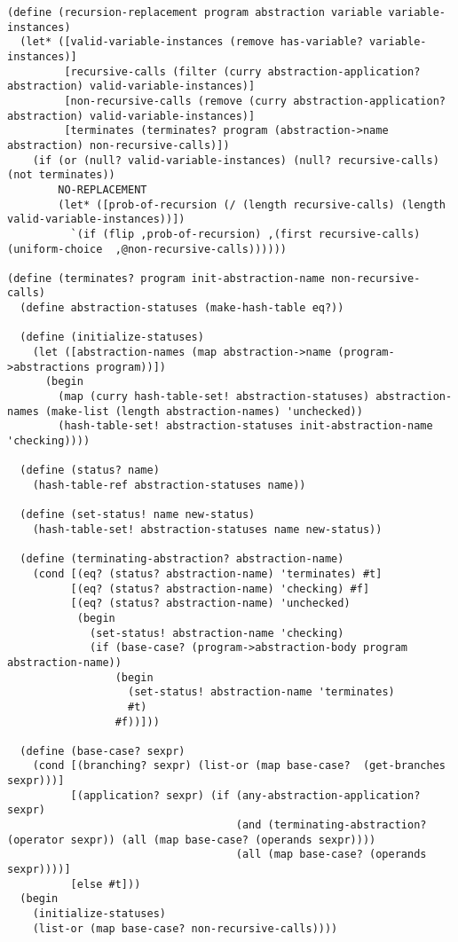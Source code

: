 \documentclass[a4paper,10pt]{article}
\begin{document}
\begin{lstlisting}[frame=trbl]
(define (recursion-replacement program abstraction variable variable-instances)
  (let* ([valid-variable-instances (remove has-variable? variable-instances)]
         [recursive-calls (filter (curry abstraction-application? abstraction) valid-variable-instances)]
         [non-recursive-calls (remove (curry abstraction-application? abstraction) valid-variable-instances)]
         [terminates (terminates? program (abstraction->name abstraction) non-recursive-calls)]) 
    (if (or (null? valid-variable-instances) (null? recursive-calls) (not terminates))
        NO-REPLACEMENT
        (let* ([prob-of-recursion (/ (length recursive-calls) (length valid-variable-instances))])
          `(if (flip ,prob-of-recursion) ,(first recursive-calls) (uniform-choice  ,@non-recursive-calls))))))

(define (terminates? program init-abstraction-name non-recursive-calls)
  (define abstraction-statuses (make-hash-table eq?))

  (define (initialize-statuses)
    (let ([abstraction-names (map abstraction->name (program->abstractions program))])
      (begin
        (map (curry hash-table-set! abstraction-statuses) abstraction-names (make-list (length abstraction-names) 'unchecked))
        (hash-table-set! abstraction-statuses init-abstraction-name 'checking))))

  (define (status? name)
    (hash-table-ref abstraction-statuses name))

  (define (set-status! name new-status)
    (hash-table-set! abstraction-statuses name new-status))
  
  (define (terminating-abstraction? abstraction-name)
    (cond [(eq? (status? abstraction-name) 'terminates) #t]
          [(eq? (status? abstraction-name) 'checking) #f]
          [(eq? (status? abstraction-name) 'unchecked)
           (begin
             (set-status! abstraction-name 'checking)
             (if (base-case? (program->abstraction-body program abstraction-name))
                 (begin
                   (set-status! abstraction-name 'terminates)
                   #t)
                 #f))]))
  
  (define (base-case? sexpr)
    (cond [(branching? sexpr) (list-or (map base-case?  (get-branches sexpr)))]
          [(application? sexpr) (if (any-abstraction-application? sexpr)
                                    (and (terminating-abstraction? (operator sexpr)) (all (map base-case? (operands sexpr))))
                                    (all (map base-case? (operands sexpr))))]
          [else #t]))
  (begin
    (initialize-statuses)
    (list-or (map base-case? non-recursive-calls))))
\end{lstlisting}
\end{document}
